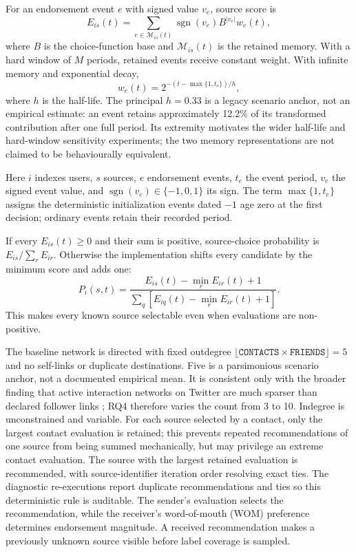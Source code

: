 For an endorsement event $e$ with signed value $v_e$, source score is
\begin{equation}
E_{is}(t)=\sum_{e\in\mathcal{M}_{is}(t)} \operatorname{sgn}(v_e)B^{|v_e|}w_e(t),
\end{equation}
where $B$ is the choice-function base and $\mathcal{M}_{is}(t)$ is the retained memory. With a hard window of $M$ periods, retained events receive constant weight. With infinite memory and exponential decay,
\begin{equation}
w_e(t)=2^{-(t-\max\{1,t_e\})/h},
\end{equation}
where $h$ is the half-life. The principal $h=0.33$ is a legacy scenario anchor, not an empirical estimate: an event retains approximately 12.2\% of its transformed contribution after one full period. Its extremity motivates the wider half-life and hard-window sensitivity experiments; the two memory representations are not claimed to be behaviourally equivalent.

Here $i$ indexes users, $s$ sources, $e$ endorsement events, $t_e$ the event period, $v_e$ the signed event value, and $\operatorname{sgn}(v_e)\in\{-1,0,1\}$ its sign. The term $\max\{1,t_e\}$ assigns the deterministic initialization events dated $-1$ age zero at the first decision; ordinary events retain their recorded period.

If every $E_{is}(t)\geq0$ and their sum is positive, source-choice probability is $E_{is}/\sum_{r}E_{ir}$. Otherwise the implementation shifts every candidate by the minimum score and adds one:
\begin{equation}
P_i(s,t)=\frac{E_{is}(t)-\min_{r}E_{ir}(t)+1}
{\sum_{q}[E_{iq}(t)-\min_{r}E_{ir}(t)+1]}.
\end{equation}
This makes every known source selectable even when evaluations are non-positive.

The baseline network is directed with fixed outdegree $\lfloor\texttt{CONTACTS}\times\texttt{FRIENDS}\rfloor=5$ and no self-links or duplicate destinations. Five is a parsimonious scenario anchor, not a documented empirical mean. It is consistent only with the broader finding that active interaction networks on Twitter are much sparser than declared follower links \citep{huberman2009}; RQ4 therefore varies the count from 3 to 10. Indegree is unconstrained and variable. For each source selected by a contact, only the largest contact evaluation is retained; this prevents repeated recommendations of one source from being summed mechanically, but may privilege an extreme contact evaluation. The source with the largest retained evaluation is recommended, with source-identifier iteration order resolving exact ties. The diagnostic re-executions report duplicate recommendations and ties so this deterministic rule is auditable. The sender's evaluation selects the recommendation, while the receiver's word-of-mouth (WOM) preference determines endorsement magnitude. A received recommendation makes a previously unknown source visible before label coverage is sampled.

